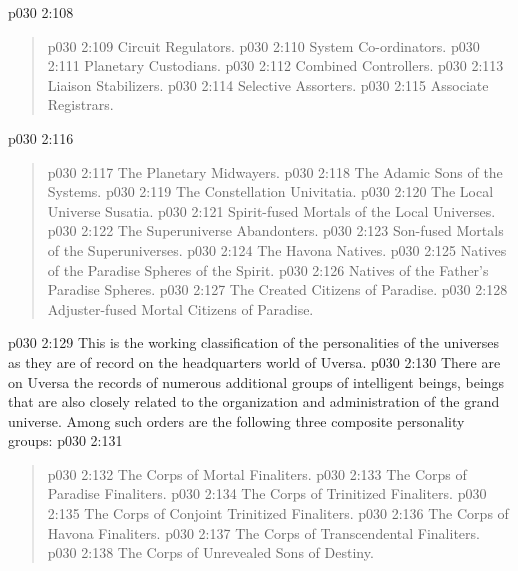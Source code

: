 \vsetspace
\vs p030 2:108 \bibnobreakspace {}
\begin{quote}
\vs p030 2:109 \bibnobreakspace Circuit Regulators.
\vs p030 2:110 \bibnobreakspace System Co\hyp{}ordinators.
\vs p030 2:111 \bibnobreakspace Planetary Custodians.
\vs p030 2:112 \bibnobreakspace Combined Controllers.
\vs p030 2:113 \bibnobreakspace Liaison Stabilizers.
\vs p030 2:114 \bibnobreakspace Selective Assorters.
\vs p030 2:115 \bibnobreakspace Associate Registrars.
\end{quote}
\vsetspace
\vs p030 2:116 \bibnobreakspace {}
\begin{quote}
\vs p030 2:117 \bibnobreakspace The Planetary Midwayers.
\vs p030 2:118 \bibnobreakspace The Adamic Sons of the Systems.
\vs p030 2:119 \bibnobreakspace The Constellation Univitatia.
\vs p030 2:120 \bibnobreakspace The Local Universe Susatia.
\vs p030 2:121 \bibnobreakspace Spirit\hyp{}fused Mortals of the Local Universes.
\vs p030 2:122 \bibnobreakspace The Superuniverse Abandonters.
\vs p030 2:123 \bibnobreakspace Son\hyp{}fused Mortals of the Superuniverses.
\vs p030 2:124 \bibnobreakspace The Havona Natives.
\vs p030 2:125 \bibnobreakspace Natives of the Paradise Spheres of the Spirit.
\vs p030 2:126 \bibnobreakspace Natives of the Father’s Paradise Spheres.
\vs p030 2:127 \bibnobreakspace The Created Citizens of Paradise.
\vs p030 2:128 \bibnobreakspace Adjuster\hyp{}fused Mortal Citizens of Paradise.
\end{quote}
\vs p030 2:129 \pc This is the working classification of the personalities of the universes as they are of record on the headquarters world of Uversa.
\vsetspace
\vs p030 2:130 \pc {} There are on Uversa the records of numerous additional groups of intelligent beings, beings that are also closely related to the organization and administration of the grand universe. Among such orders are the following three composite personality groups:
\vsetspace
\vs p030 2:131 \bibnobreakspace {}
\begin{quote}
\vs p030 2:132 \bibnobreakspace The Corps of Mortal Finaliters.
\vs p030 2:133 \bibnobreakspace The Corps of Paradise Finaliters.
\vs p030 2:134 \bibnobreakspace The Corps of Trinitized Finaliters.
\vs p030 2:135 \bibnobreakspace The Corps of Conjoint Trinitized Finaliters.
\vs p030 2:136 \bibnobreakspace The Corps of Havona Finaliters.
\vs p030 2:137 \bibnobreakspace The Corps of Transcendental Finaliters.
\vs p030 2:138 \bibnobreakspace The Corps of Unrevealed Sons of Destiny.
\end{quote}
